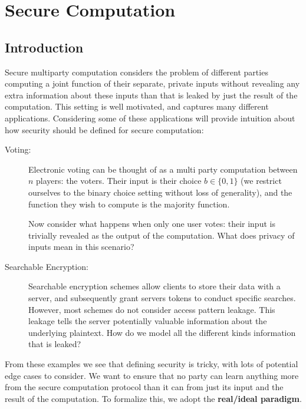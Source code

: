 
\newcommand{\out}{\mathsf{out}}
\newcommand{\Assign}{:=}

\chapter{Secure Computation}

\section{Introduction}
Secure multiparty computation considers the problem of different parties
computing a joint function of their separate, private inputs without revealing
any extra information about these inputs than that is leaked by just the result
of the computation. This setting is well motivated, and captures many different
applications. Considering some of these applications will provide intuition
about how security should be defined for secure computation:
\begin{description}
  \item[Voting:] Electronic voting can be thought of as a multi party computation
	  between $n$ players: the voters. Their input is their choice $b \in \{0,1\}$
    (we restrict ourselves to the binary choice setting without loss of generality), and the function
    they wish to compute is the majority function.

    Now consider what happens when only one user votes: their input is trivially
    revealed as the output of the computation. What does privacy of inputs mean
    in this scenario?

  \item[Searchable Encryption:] Searchable encryption schemes allow clients
    to store their data with a server, and subsequently grant servers tokens
    to conduct specific searches. However, most schemes do not consider access
    pattern leakage. This leakage tells the server potentially valuable information
    about the underlying plaintext. How do we model all the different kinds
    information that is leaked?
\end{description}

From these examples we see that defining security is tricky, with lots of
potential edge cases to consider. We want to ensure that no party can learn
anything more from the secure computation protocol than it can from just its
input and the result of the computation. To formalize this, we adopt the
\textbf{real/ideal paradigm}.



